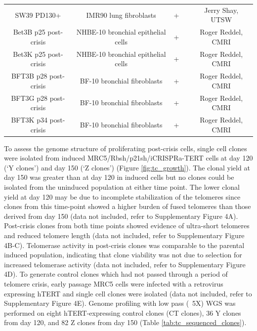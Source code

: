\documentclass[phd,tocprelim]{cornell}
\begin{document}
\begin{table}[]
{\begin{tabular}{ccccc}
            SW39 PD130+           & IMR90 lung   fibroblasts             & +  & \cite{Shay1989-ua} & Jerry Shay, UTSW         \\
            Bet3B p25 post-crisis & NHBE-10 bronchial   epithelial cells & + & \cite{Bryan1995-ik}      & Roger Reddel, CMRI       \\
            Bet3K p25 post-crisis & NHBE-10 bronchial   epithelial cells & + & \cite{Bryan1995-ik}      & Roger Reddel, CMRI       \\
            BFT3B p28 post-crisis & BF-10 bronchial   fibroblasts        & + & \cite{Bryan1995-ik}      & Roger Reddel, CMRI       \\
            BFT3G p28 post-crisis & BF-10 bronchial   fibroblasts        & + & \cite{Bryan1995-ik}      & Roger Reddel, CMRI       \\
            BFT3K p34 post-crisis & BF-10 bronchial   fibroblasts        & + & \cite{Bryan1995-ik}      & Roger Reddel, CMRI       \\ \hline
        \end{tabular}
    }
\end{table}

To assess the genome structure of proliferating post-crisis cells, single cell clones were isolated from induced MRC5/Rbsh/p21sh/iCRISPRa-TERT cells at day 120 (‘Y clones’) and day 150 (‘Z clones’) (Figure \ref{fig:tc_growth}). The clonal yield at day 150 was greater than at day 120 in induced cells but no clones could be isolated from the uninduced population at either time point. The lower clonal yield at day 120 may be due to incomplete stabilization of the telomeres since clones from this time-point showed a higher burden of fused telomeres than those derived from day 150 (data not included, refer to \cite{Dewhurst2021-jk} Supplementary Figure 4A). Post-crisis clones from both time points showed evidence of ultra-short telomeres and reduced telomere length (data not included, refer to \cite{Dewhurst2021-jk} Supplementary Figure 4B-C). Telomerase activity in post-crisis clones was comparable to the parental induced population, indicating that clone viability was not due to selection for increased telomerase activity (data not included, refer to \cite{Dewhurst2021-jk} Supplementary Figure 4D). To generate control clones which had not passed through a period of telomere crisis, early passage MRC5 cells were infected with a retrovirus expressing hTERT and single cell clones were isolated (data not included, refer to \cite{Dewhurst2021-jk} Supplementary Figure 4E). Genome profiling with low pass (~5X) WGS was performed on eight hTERT-expressing control clones (CT clones), 36 Y clones from day 120, and 82 Z clones from day 150 (Table \ref{tab:tc_sequenced_clones}).
\end{document}
